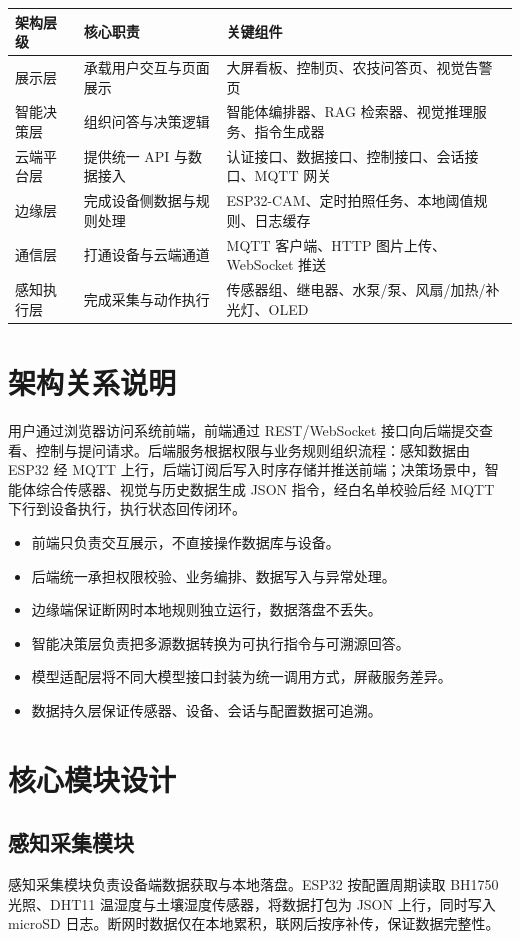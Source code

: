 \documentclass[11pt]{ctexart}
\begin{document}
\begin{longtable}{p{2.8cm}p{5.0cm}p{7.0cm}}
  \toprule
  架构层级 & 核心职责 & 关键组件 \\
  \midrule
  展示层 & 承载用户交互与页面展示 & 大屏看板、控制页、农技问答页、视觉告警页 \\
  智能决策层 & 组织问答与决策逻辑 & 智能体编排器、RAG 检索器、视觉推理服务、指令生成器 \\
  云端平台层 & 提供统一 API 与数据接入 & 认证接口、数据接口、控制接口、会话接口、MQTT 网关 \\
  边缘层 & 完成设备侧数据与规则处理 & ESP32-CAM、定时拍照任务、本地阈值规则、日志缓存 \\
  通信层 & 打通设备与云端通道 & MQTT 客户端、HTTP 图片上传、WebSocket 推送 \\
  感知执行层 & 完成采集与动作执行 & 传感器组、继电器、水泵/泵、风扇/加热/补光灯、OLED \\
  \bottomrule
\end{longtable}

\section{架构关系说明}
用户通过浏览器访问系统前端，前端通过 REST/WebSocket 接口向后端提交查看、控制与提问请求。后端服务根据权限与业务规则组织流程：感知数据由 ESP32 经 MQTT 上行，后端订阅后写入时序存储并推送前端；决策场景中，智能体综合传感器、视觉与历史数据生成 JSON 指令，经白名单校验后经 MQTT 下行到设备执行，执行状态回传闭环。

\begin{itemize}
  \item 前端只负责交互展示，不直接操作数据库与设备。
  \item 后端统一承担权限校验、业务编排、数据写入与异常处理。
  \item 边缘端保证断网时本地规则独立运行，数据落盘不丢失。
  \item 智能决策层负责把多源数据转换为可执行指令与可溯源回答。
  \item 模型适配层将不同大模型接口封装为统一调用方式，屏蔽服务差异。
  \item 数据持久层保证传感器、设备、会话与配置数据可追溯。
\end{itemize}

\section{核心模块设计}
\subsection{感知采集模块}
感知采集模块负责设备端数据获取与本地落盘。ESP32 按配置周期读取 BH1750 光照、DHT11 温湿度与土壤湿度传感器，将数据打包为 JSON 上行，同时写入 microSD 日志。断网时数据仅在本地累积，联网后按序补传，保证数据完整性。
\end{document}
